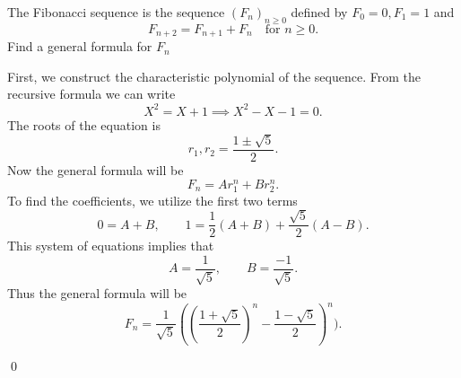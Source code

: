 \begin{problem}
	The Fibonacci sequence is the sequence $(F_n)_{n\geq0}$ defined by $F_0 = 0, F_1=1$ and 
	\[ F_{n+2} = F_{n+1} + F_n \quad \text{for } n\geq 0.  \]
	Find a general formula for $F_n$
\end{problem}
\begin{solution}
	First, we construct the characteristic polynomial of the sequence. From the recursive formula we can write
	\[ X^2 = X + 1 \implies \boxed{X^2 - X - 1 = 0}. \]
	The roots of the equation is 
	\[ r_1, r_2 = \frac{1 \pm \sqrt{5}}{2}. \]
	Now the general formula will be
	\[ F_n = Ar_1^n + Br_2^n. \] 
	To find the coefficients, we utilize the first two terms 
	\[ 0 = A + B, \qquad 1 = \frac{1}{2}(A+B) + \frac{\sqrt{5}}{2}(A-B). \]
	This system of equations implies that
	\[ A = \frac{1}{\sqrt{5}}, \qquad B=\frac{-1}{\sqrt{5}}.  \]
	Thus the general formula will be
	\[ \boxed{F_n = \frac{1}{\sqrt{5}}((\frac{1+\sqrt{5}}{2})^n - \frac{1-\sqrt{5}}{2})^n)}. \]
	
	\qed
	
\end{solution}